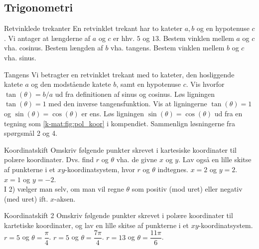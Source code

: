 \subsection*{Trigonometri}
\begin{opgave}[1]{Retvinklede trekanter}
En retvinklet trekant har to kateter $a,b$ og en hypotenuse $c$. Vi antager at længderne af $a$ og $c$ er hhv. $5$ og $13$.
\opg Bestem vinklen mellem $a$ og $c$ vha. cosinus.
\opg Bestem længden af $b$ vha. tangens.
\opg Bestem vinklen mellem $b$ og $c$ vha. sinus.
\end{opgave}
\begin{opgave}[1]{Tangens}
Vi betragter en retvinklet trekant med to kateter, den hosliggende katete $a$ og den modstående katete $b$, samt en hypotenuse $c$.
\opg Vis hvorfor $\tan(\theta)=b/a$ ud fra definitionen af sinus og cosinus.
\opg Løs ligningen $\tan(\theta)=1$ med den inverse tangensfunktion.
\opg Vis at ligningerne $\tan(\theta)=1$ og $\sin(\theta) = \cos(\theta)$ er ens.
\opg Løs ligningen $\sin(\theta) = \cos(\theta)$ ud fra en tegning som \cref{k-mat:fig:pol_koor} i kompendiet.
\opg Sammenlign løsningerne fra spørgsmål 2 og 4.
\end{opgave}
\begin{opgave}[1]{Koordinatskift}
Omskriv følgende punkter skrevet i kartesiske koordinater til polære koordinater. Dvs. find $r$ og $\theta$ vha. de givne $x$ og $y$. Lav også en lille skitse af punkterne i et $xy$-koordinatsystem, hvor $r$ og $\theta$ indtegnes.
\opg $x=2$ og $y=2$.
\opg $x=1$ og $y=-2$.\\
I 2) vælger man selv, om man vil regne $\theta$ som positiv (mod uret) eller negativ (med uret) ift. $x$-aksen.
\end{opgave}
\begin{opgave}[1]{Koordinatskift 2}
Omskriv følgende punkter skrevet i polære koordinater til kartetiske koordinater, og lav en lille skitse af punkterne i et $xy$-koordinatsystem.
\opg $r=5$ og $\theta=\dfrac{\pi}{4}$.
\opg $r=5$ og $\theta=\dfrac{7\pi}{4}$.
\opg $r=13$ og $\theta=\dfrac{11\pi}{6}$.
\end{opgave}
